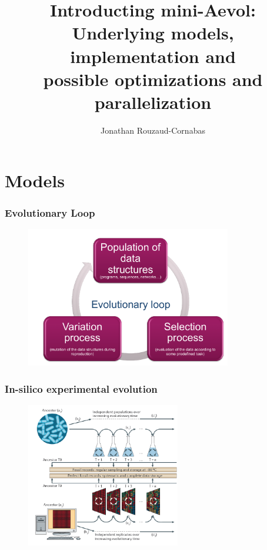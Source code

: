 \documentclass{beamer}
\title[Mini-Aevol]{Introducting mini-Aevol:\\ Underlying models, implementation and\\ possible optimizations and parallelization}
\author[J. Rouzaud-Cornabas]{Jonathan Rouzaud-Cornabas}
\institute[Insa de Lyon -- Inria]{LIRIS / Insa de Lyon -- Inria Beagle}
\date{}
\begin{document}
 
\begin{frame}
\maketitle
\end{frame}

\section{Models}

\begin{frame}
 \frametitle{Evolutionary Loop}
  \begin{figure}
        \includegraphics[width=0.8\textwidth]{figs/evol_loop}
\end{figure}
\end{frame}


\begin{frame}
 \frametitle{In-silico experimental evolution}
  \begin{figure}
        \includegraphics[width=0.6\textwidth]{figs/in_silico_evol}
\end{figure}
\end{frame}
\end{document}
